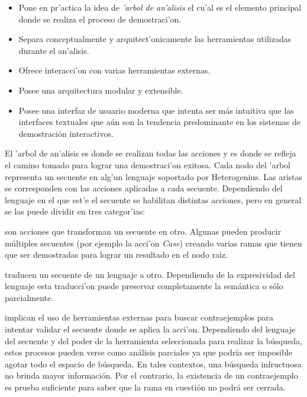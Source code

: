 \begin{itemize}

\item Pone en pr'actica la idea de \textit{'arbol de an'alisis} el cu'al es el elemento principal donde se realiza el proceso de demostraci'on. 

\item Separa conceptualmente y arquitect'onicamente las herramientas utilizadas durante el an'alisis.

\item Ofrece interacci'on con varias herramientas externas.

\item Posee una arquitectura modular y extensible.

\item Posee una interfaz de usuario moderna que intenta ser más intuitiva que las interfaces textuales que aún son la tendencia predominante en los sistemas de demostración interactivos.

\end{itemize}

El 'arbol de an'alisis es donde se realizan todas las acciones y es donde se refleja el camino tomado para lograr una demostraci'on exitosa. Cada nodo del 'arbol representa un secuente en alg'un lenguaje soportado por Heterogenius. Las aristas se corresponden con las acciones aplicadas a cada secuente. Dependiendo del lenguaje en el que est'e el secuente se habilitan distintas acciones, pero en general se las puede dividir en tres categor'ias:

\begin{description}
\label{clasificacion}
\item[\textbf{reglas del c'alculo de secuentes}:] son acciones que transforman un secuente en otro. Algunas pueden producir múltiples secuentes (por ejemplo la acci'on \emph{Case}) creando varias ramas que tienen que ser demostradas para lograr un resultado en el nodo raiz.

\item[\textbf{traducciones}:] traducen un secuente de un lenguaje a otro. Dependiendo de la expresividad del lenguaje esta traducci'on puede preservar completamente la semántica o sólo parcialmente.

\item[\textbf{búsquedas de contraejemplos}:] implican el uso de herramientas externas para buscar contraejemplos para intentar validar el secuente donde se aplica la acci'on. 
Dependiendo del lenguaje del secuente y del poder de la herramienta seleccionada para realizar la búsqueda, estos procesos pueden verse como análisis parciales ya que podría ser imposible agotar todo el espacio de búsqueda. En tales contextos, una búsqueda infructuosa no brinda mayor información. Por el contrario, la existencia de un contraejemplo es prueba suficiente para saber que la rama en cuestión no podrá ser cerrada.
\end{description}

